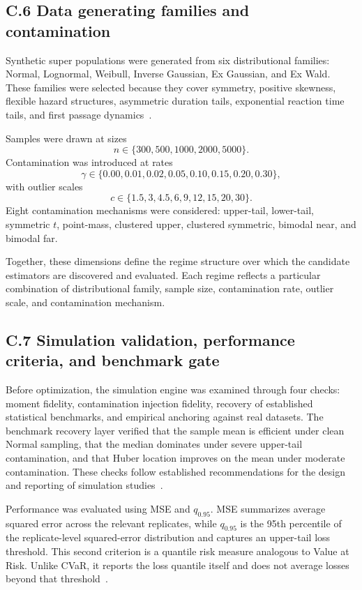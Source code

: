 \subsection*{C.6 Data generating families and contamination}
Synthetic super populations were generated from six distributional families: Normal, Lognormal, Weibull, Inverse Gaussian, Ex Gaussian, and Ex Wald. These families were selected because they cover symmetry, positive skewness, flexible hazard structures, asymmetric duration tails, exponential reaction time tails, and first passage dynamics~\citep{aitchison1957lognormal,weibull1951,chhikara1989inversegaussian,schwarz2001exwald,heathcote2004fitting}.

Samples were drawn at sizes
\[
n\in\{300,500,1000,2000,5000\}.
\]
Contamination was introduced at rates
\[
\gamma\in\{0.00,0.01,0.02,0.05,0.10,0.15,0.20,0.30\},
\]
with outlier scales
\[
c\in\{1.5,3,4.5,6,9,12,15,20,30\}.
\]
Eight contamination mechanisms were considered: upper-tail, lower-tail, symmetric $t$, point-mass, clustered upper, clustered symmetric, bimodal near, and bimodal far.

Together, these dimensions define the regime structure over which the candidate estimators are discovered and evaluated. Each regime reflects a particular combination of distributional family, sample size, contamination rate, outlier scale, and contamination mechanism.

\subsection*{C.7 Simulation validation, performance criteria, and benchmark gate}
Before optimization, the simulation engine was examined through four checks: moment fidelity, contamination injection fidelity, recovery of established statistical benchmarks, and empirical anchoring against real datasets. The benchmark recovery layer verified that the sample mean is efficient under clean Normal sampling, that the median dominates under severe upper-tail contamination, and that Huber location improves on the mean under moderate contamination. These checks follow established recommendations for the design and reporting of simulation studies~\citep{law2015simulation,morris2019simulation}.

Performance was evaluated using MSE and \(q_{0.95}\). MSE summarizes average squared error across the relevant replicates, while \(q_{0.95}\) is the 95th percentile of the replicate-level squared-error distribution and captures an upper-tail loss threshold. This second criterion is a quantile risk measure analogous to Value at Risk. Unlike CVaR, it reports the loss quantile itself and does not average losses beyond that threshold~\citep{artzner1999coherent,rockafellar2000cvar}.

